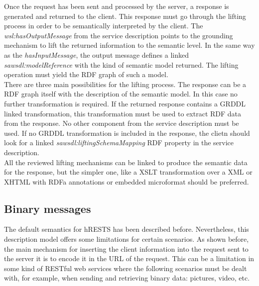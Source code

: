 Once the request has been sent and processed by the server, a response is generated and returned to the client. This response must go through the lifting process in order to be semantically interpreted by the client. The \emph{wsl:hasOutputMessage} from the service description points to the grounding mechanism to lift the returned information to the semantic level. In the same way as the \emph{hasInputMessage}, the output message defines a linked \emph{sawsdl:modelReference} with the kind of semantic model returned. The lifting operation must yield the RDF graph of such a model.\\
 There are three main possibilities for the lifting process.
The response can be a RDF graph itself with the description of the semantic model. In this case no further transformation is required. If the returned response contains a GRDDL linked transformation, this transformation must be used to extract RDF data from the response. No other component from the service description must be used. If no GRDDL transformation is included in the response, the clietn should look for a linked \emph{sawsdl:liftingSchemaMapping} RDF property in the service description.\\
All the reviewed lifting mechanisms can be linked to produce the semantic data for the response, but the simpler one, like a XSLT transformation over a XML or XHTML with RDFa annotations or embedded microformat should be preferred.\\

\subsection{Binary messages}

The default semantics for hRESTS has been described before. Nevertheless, this description model offers some limitations for certain scenarios. As shown before, the main mechanism for inserting the client information into the request sent to the server it is to encode it in the URL of the request. This can be a limitation in some kind of RESTful web services where the following scenarios must be dealt with, for example, when sending and retrieving binary data: pictures, video, etc.

